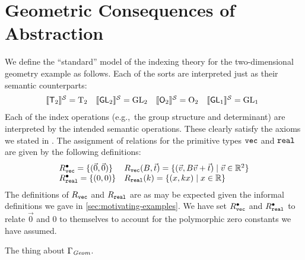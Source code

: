 \section{Geometric Consequences of Abstraction}
\label{sec:instantiations}


\begin{example} We define the ``standard''
  model of the indexing theory for the two-dimensional geometry
  example as follows. Each of the sorts are interpreted just as their
  semantic counterparts:
  \begin{displaymath}
    \begin{array}{@{}llll}
      \semSort{\SynTransl{2}} = \Transl{2}
      &
      \semSort{\SynGL{2}} = \GL{2}
      &
      \semSort{\SynOrth{2}} = \Orth{2}
      &
      \semSort{\SynGL{1}} = \GL{1}
    \end{array}
  \end{displaymath}
  Each of the index operations (e.g.,~the group structure and
  determinant) are interpreted by the intended semantic
  operations. These clearly satisfy the axioms we stated in
  . The assignment of relations for the
  primitive types $\texttt{vec}$ and $\texttt{real}$ are given by
  the following definitions:
  \begin{displaymath}
    \begin{array}{ll}
      R^{\bullet}_{\texttt{vec}} = \{( \vec{0}, \vec{0} ) \}&
      R_{\texttt{vec}}(B,\vec{t}) = \{ (\vec{v}, B\vec{v} + \vec{t}) \mathrel| \vec{v} \in \mathbb{R}^2 \} \\
      R^{\bullet}_{\texttt{real}} = \{(0,0)\} &
      R_{\texttt{real}}(k) = \{ (x, kx) \mathrel| x \in \mathbb{R} \}
    \end{array}
  \end{displaymath}
  The definitions of $R_{\texttt{vec}}$ and $R_{\texttt{real}}$
  are as may be expected given the informal definitions we gave in
  \autoref{sec:motivating-examples}. We have set
  $R^\bullet_{\texttt{vec}}$ and $R^\bullet_{\texttt{real}}$ to
  relate $\vec{0}$ and $0$ to themselves to account for the
  polymorphic zero constants we have assumed.
\end{example}

\begin{lemma}
  The thing about $\Gamma_{\mathit{Geom}}$.
\end{lemma}

